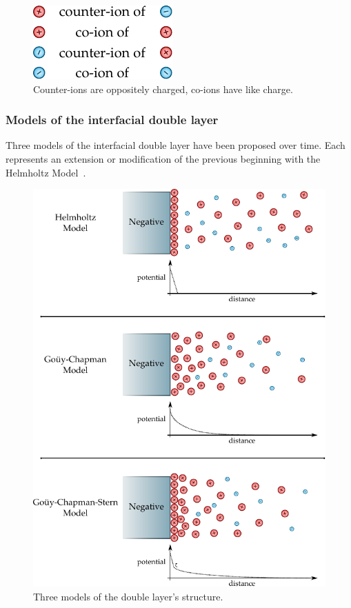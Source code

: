     \begin{figure}
      \begin{center}
        \includegraphics{content/introduction/graphics/counterAndCoIons}
      \end{center}
      \caption{Counter-ions are oppositely charged, co-ions have like charge.}
      \label{fig:counterAndCoIons}
    \end{figure}

  \subsubsection*{Models of the interfacial double layer}

    Three models of the interfacial double layer have been proposed over time.
    Each represents an extension or modification of the previous beginning with the Helmholtz Model~\cite{Horch2004}.

    \begin{figure}
      \begin{center}
        \includegraphics{content/introduction/graphics/doubleLayerModels}
      \end{center}
      \caption{Three models of the double layer's structure.}
      \label{fig:doubleLayerModels}
    \end{figure}

